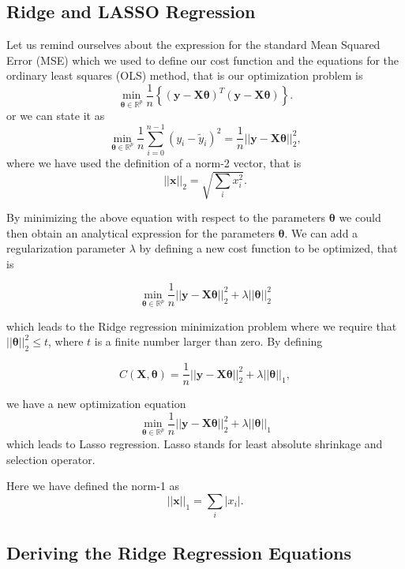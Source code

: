 \documentclass[%
oneside,                 %
final,                   %
10pt]{article}
\begin{document}
\subsection*{Ridge and LASSO Regression}

Let us remind ourselves about the expression for the standard Mean Squared Error (MSE) which we used to define our cost function and the equations for the ordinary least squares (OLS) method, that is 
our optimization problem is
\[
{\displaystyle \min_{\bm{\theta}\in {\mathbb{R}}^{p}}}\frac{1}{n}\left\{\left(\bm{y}-\bm{X}\bm{\theta}\right)^T\left(\bm{y}-\bm{X}\bm{\theta}\right)\right\}.
\]
or we can state it as
\[
{\displaystyle \min_{\bm{\theta}\in
{\mathbb{R}}^{p}}}\frac{1}{n}\sum_{i=0}^{n-1}\left(y_i-\tilde{y}_i\right)^2=\frac{1}{n}\vert\vert \bm{y}-\bm{X}\bm{\theta}\vert\vert_2^2,
\]
where we have used the definition of  a norm-2 vector, that is
\[
\vert\vert \bm{x}\vert\vert_2 = \sqrt{\sum_i x_i^2}. 
\]

By minimizing the above equation with respect to the parameters
$\bm{\theta}$ we could then obtain an analytical expression for the
parameters $\bm{\theta}$.  We can add a regularization parameter $\lambda$ by
defining a new cost function to be optimized, that is

\[
{\displaystyle \min_{\bm{\theta}\in
{\mathbb{R}}^{p}}}\frac{1}{n}\vert\vert \bm{y}-\bm{X}\bm{\theta}\vert\vert_2^2+\lambda\vert\vert \bm{\theta}\vert\vert_2^2
\]

which leads to the Ridge regression minimization problem where we
require that $\vert\vert \bm{\theta}\vert\vert_2^2\le t$, where $t$ is
a finite number larger than zero. By defining

\[
C(\bm{X},\bm{\theta})=\frac{1}{n}\vert\vert \bm{y}-\bm{X}\bm{\theta}\vert\vert_2^2+\lambda\vert\vert \bm{\theta}\vert\vert_1,
\]

we have a new optimization equation
\[
{\displaystyle \min_{\bm{\theta}\in
{\mathbb{R}}^{p}}}\frac{1}{n}\vert\vert \bm{y}-\bm{X}\bm{\theta}\vert\vert_2^2+\lambda\vert\vert \bm{\theta}\vert\vert_1
\]
which leads to Lasso regression. Lasso stands for least absolute shrinkage and selection operator. 

Here we have defined the norm-1 as 
\[
\vert\vert \bm{x}\vert\vert_1 = \sum_i \vert x_i\vert. 
\]

\subsection*{Deriving the  Ridge Regression Equations}
\end{document}
